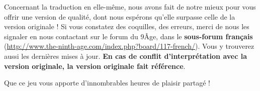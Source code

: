 {Concernant la traduction en elle-même, nous avons fait de notre mieux pour vous offrir une version de qualité, dont nous espérons qu'elle surpasse celle de la version originale ! Si vous constatez des coquilles, des erreurs, merci de nous les signaler en nous contactant sur le forum du 9\ieme Âge, dans le \textbf{sous-forum français} (\url{http://www.the-ninth-age.com/index.php?board/117-french/}). Vous y trouverez aussi les dernières mises à jour. \textbf{En cas de conflit d'interprétation avec la version originale, la version originale fait référence}.

\vspace{0.5cm}
Que ce jeu vous apporte d'innombrables heures de plaisir partagé !

\vspace{0.7cm}
\vspace{0.1cm}

}
\newcommand{\labels@secondpageannouncement}{%
	\labels@fantasybattles{} : \labels@NinthAge{} est un jeu créé et entretenu par la communauté qui met en scène des affrontements de figurines. Toutes les règles ainsi que les retours et suggestions peuvent être trouvées ou donnés sur le site :
	\newline\url{http://www.the-ninth-age.com/}
}
\newcommand{\labels@rulechanges}{%
	Les changements de règles entre versions sont colorés comme ce paragraphe. Une liste en anglais de ces changements par version est ajoutée à la fin de cet ouvrage.
}
\newcommand{\labels@latexcredit}{Document réalisé à l'aide de \LaTeX .}



\newcommand{\free}{gratuit}
\newcommand{\upto}{jusqu'à}
\newcommand{\Upto}{Jusqu'à}
\newcommand{\unlimited}{sans limite de pts}
\newcommand{\permodel}{/fig}
\newcommand{\listlastchoice}{, ou}
\newcommand{\notif}[1]{(pas #1)}
\newcommand{\wordand}{et}
\newcommand{\wordwith}{avec}
\newcommand{\ifNmodelsorless}[1]{(#1 figurines ou moins)}
\newcommand{\unitwith}{unité avec}
\newcommand{\From}{De} %
\newcommand{\wordto}{à}
\newcommand{\wordAll}{Tous}
\newcommand{\spacebeforecolon}{ } %
\newcommand{\pricepermodelabovemin}{Prix par fig. au delà de la taille minimale :}
\newcommand{\minprice}{Prix min. :}


